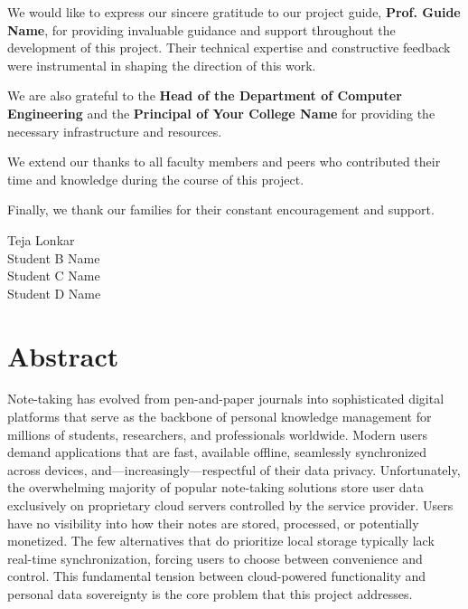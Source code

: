 \documentclass[12pt, a4paper, oneside]{report}
\newcommand{\collegename}{Your College Name}               %
\newcommand{\departmentname}{Department of Computer Engineering} %
\newcommand{\guidename}{Prof. Guide Name}                  %
\newcommand{\studentA}{Teja Lonkar}                        %
\newcommand{\studentB}{Student B Name}                     %
\newcommand{\studentC}{Student C Name}                     %
\newcommand{\studentD}{Student D Name}                     %
\begin{document}
We would like to express our sincere gratitude to our project guide, \textbf{\guidename}, for providing invaluable guidance and support throughout the development of this project. Their technical expertise and constructive feedback were instrumental in shaping the direction of this work.

We are also grateful to the \textbf{Head of the \departmentname} and the \textbf{Principal of \collegename} for providing the necessary infrastructure and resources.

We extend our thanks to all faculty members and peers who contributed their time and knowledge during the course of this project.

Finally, we thank our families for their constant encouragement and support.

\vspace{1.5cm}
\begin{flushright}
    \studentA\\
    \studentB\\
    \studentC\\
    \studentD\\
\end{flushright}

\chapter*{Abstract}

Note-taking has evolved from pen-and-paper journals into sophisticated digital platforms that serve as the backbone of personal knowledge management for millions of students, researchers, and professionals worldwide. Modern users demand applications that are fast, available offline, seamlessly synchronized across devices, and---increasingly---respectful of their data privacy. Unfortunately, the overwhelming majority of popular note-taking solutions store user data exclusively on proprietary cloud servers controlled by the service provider. Users have no visibility into how their notes are stored, processed, or potentially monetized. The few alternatives that do prioritize local storage typically lack real-time synchronization, forcing users to choose between convenience and control. This fundamental tension between cloud-powered functionality and personal data sovereignty is the core problem that this project addresses.
\end{document}
